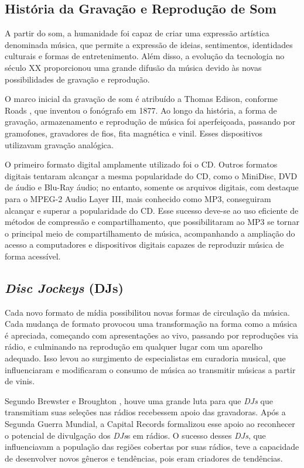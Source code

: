 \subsection{História da Gravação e Reprodução de Som}
A partir do som, a humanidade foi capaz de criar uma expressão artística denominada música, que permite a expressão de ideias, sentimentos, identidades culturais e formas de entretenimento. Além disso, a evolução da tecnologia no século XX proporcionou uma grande difusão da música devido às novas possibilidades de gravação e reprodução. \par
O marco inicial da gravação de som é atribuído a Thomas Edison, conforme Roads \cite{roads1996computer}, que inventou o fonógrafo em 1877. Ao longo da história, a forma de gravação, armazenamento e reprodução de música foi aperfeiçoada, passando por gramofones, gravadores de fios, fita magnética e vinil. Esses dispositivos utilizavam gravação analógica. \par
O primeiro formato digital amplamente utilizado foi o CD. Outros formatos digitais tentaram alcançar a mesma popularidade do CD, como o MiniDisc, DVD de áudio e Blu-Ray áudio; no entanto, somente os arquivos digitais, com destaque para o MPEG-2 Audio Layer III, mais conhecido como MP3, conseguiram alcançar e superar a popularidade do CD. Esse sucesso deve-se ao uso eficiente de métodos de compressão e compartilhamento, que possibilitaram ao MP3 se tornar o principal meio de compartilhamento de música, acompanhando a ampliação do acesso a computadores e dispositivos digitais capazes de reproduzir música de forma acessível.

\subsection{\textit{Disc Jockeys} (DJs)}

Cada novo formato de mídia possibilitou novas formas de circulação da música. Cada mudança de formato provocou uma transformação na forma como a música é apreciada, começando com apresentações ao vivo, passando por reproduções via rádio, e culminando na reprodução em qualquer lugar com um aparelho adequado. Isso levou ao surgimento de especialistas em curadoria musical, que influenciaram e modificaram o consumo de música ao transmitir músicas a partir de vinis.

Segundo Brewster e Broughton \cite{lastnight}, houve uma grande luta para que \textit{DJs} que transmitiam suas seleções nas rádios recebessem apoio das gravadoras. Após a Segunda Guerra Mundial, a Capital Records formalizou esse apoio ao reconhecer o potencial de divulgação dos \textit{DJs}s em rádios. O sucesso desses \textit{DJs}, que influenciavam a população das regiões cobertas por suas rádios, teve a capacidade de desenvolver novos gêneros e tendências, pois eram criadores de tendências.

